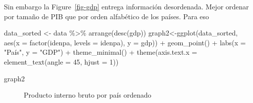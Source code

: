 \documentclass[
  letterpaper,
  DIV=11,
  numbers=noendperiod]{scrartcl}
\newenvironment{Shaded}{\begin{snugshade}}{\end{snugshade}}
\newcommand{\AttributeTok}[1]{\textcolor[rgb]{0.40,0.45,0.13}{#1}}
\newcommand{\DecValTok}[1]{\textcolor[rgb]{0.68,0.00,0.00}{#1}}
\newcommand{\FunctionTok}[1]{\textcolor[rgb]{0.28,0.35,0.67}{#1}}
\newcommand{\NormalTok}[1]{\textcolor[rgb]{0.00,0.23,0.31}{#1}}
\newcommand{\OtherTok}[1]{\textcolor[rgb]{0.00,0.23,0.31}{#1}}
\newcommand{\SpecialCharTok}[1]{\textcolor[rgb]{0.37,0.37,0.37}{#1}}
\newcommand{\StringTok}[1]{\textcolor[rgb]{0.13,0.47,0.30}{#1}}
\begin{document}
Sin embargo la Figure~\ref{fig-gdp} entrega información desordenada.
Mejor ordenar por tamaño de PIB que por orden alfabético de los países.
Para eso

\begin{Shaded}
\begin{Highlighting}[]
\NormalTok{data\_sorted }\OtherTok{\textless{}{-}}\NormalTok{ data }\SpecialCharTok{\%\textgreater{}\%} \FunctionTok{arrange}\NormalTok{(}\FunctionTok{desc}\NormalTok{(gdp))}
\NormalTok{graph2}\OtherTok{\textless{}{-}}\FunctionTok{ggplot}\NormalTok{(data\_sorted, }\FunctionTok{aes}\NormalTok{(}\AttributeTok{x =} \FunctionTok{factor}\NormalTok{(idenpa, }\AttributeTok{levels =}\NormalTok{ idenpa), }\AttributeTok{y =}\NormalTok{ gdp)) }\SpecialCharTok{+}
  \FunctionTok{geom\_point}\NormalTok{() }\SpecialCharTok{+}
  \FunctionTok{labs}\NormalTok{(}\AttributeTok{x =} \StringTok{"País"}\NormalTok{, }\AttributeTok{y =} \StringTok{"GDP"}\NormalTok{) }\SpecialCharTok{+}
  \FunctionTok{theme\_minimal}\NormalTok{() }\SpecialCharTok{+}
  \FunctionTok{theme}\NormalTok{(}\AttributeTok{axis.text.x =} \FunctionTok{element\_text}\NormalTok{(}\AttributeTok{angle =} \DecValTok{45}\NormalTok{, }\AttributeTok{hjust =} \DecValTok{1}\NormalTok{))}

\NormalTok{graph2}
\end{Highlighting}
\end{Shaded}

\begin{figure}[H]


\caption{\label{fig-gdp-order}Producto interno bruto por país ordenado}

\end{figure}%
\end{document}
